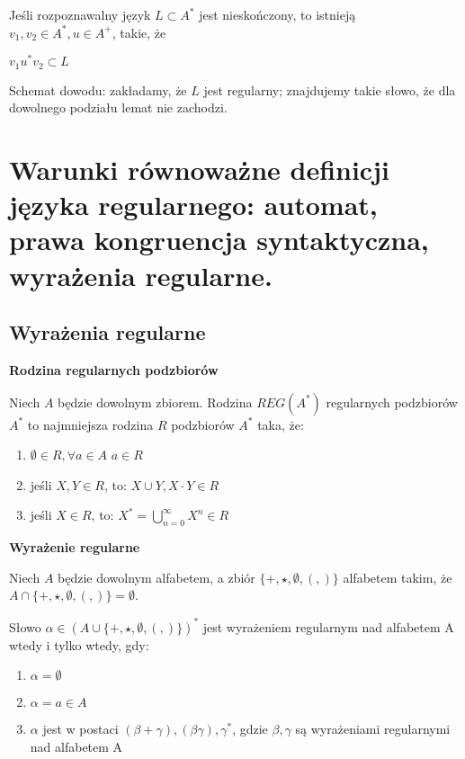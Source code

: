 \documentclass[main.tex]{subfiles}
\begin{document}
    \begin{definition}
        Jeśli rozpoznawalny język $L \subset A^*$ jest nieskończony, to istnieją
        $v_1, v_2 \in A^*, u \in A^+$, takie, że
        \begin{center}
            $v_1 u^* v_2 \subset L$
        \end{center}
    \end{definition}

    Schemat dowodu: zakładamy, że $L$ jest regularny; znajdujemy takie słowo, że dla dowolnego podziału lemat nie zachodzi.


    \section{Warunki równoważne definicji języka regularnego: automat, prawa kongruencja syntaktyczna, wyrażenia regularne.}
    \subsection{Wyrażenia regularne}

    \begin{definition}
        \textbf{Rodzina regularnych podzbiorów}

        Niech $A$ będzie dowolnym zbiorem. Rodzina $REG(A^*)$ regularnych podzbiorów
        $A^*$ to najmniejsza rodzina $R$ podzbiorów $A^*$ taka, że:

        \begin{enumerate}[noitemsep]
            \item $\emptyset \in R, \forall a \in A$ ${a} \in R$
            \item jeśli $X, Y \in R$, to: $X \cup Y, X \cdot Y \in R$
            \item jeśli $X \in R$, to: $X^* = \bigcup\limits_{n = 0}^{\infty} X^n \in R$
        \end{enumerate}
    \end{definition}

    \begin{definition}
        \textbf{Wyrażenie regularne}

        Niech $A$ będzie dowolnym alfabetem, a zbiór $\{+, \star, \emptyset, (,)\}$
        alfabetem takim, że $A \cap \{+, \star, \emptyset, (,)\} = \emptyset$.

        Słowo $\alpha \in (A \cup \{+, \star, \emptyset, (,)\})^*$ jest wyrażeniem regularnym
        nad alfabetem A wtedy i tylko wtedy, gdy:

        \begin{enumerate}[noitemsep]
            \item $\alpha = \emptyset$
            \item $\alpha = a \in A$
            \item $\alpha$ jest w postaci $(\beta + \gamma), (\beta\gamma), \gamma^*$, gdzie
            $\beta, \gamma$ są wyrażeniami regularnymi nad alfabetem A
        \end{enumerate}
    \end{definition}
\end{document}
